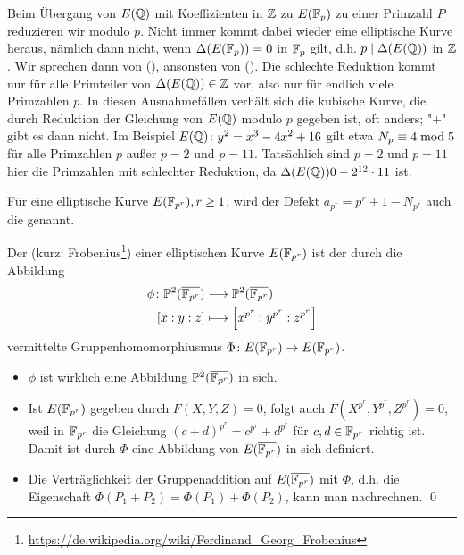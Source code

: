 \begin{bem}
	Beim Übergang von $E(\mathbb{Q})$ mit Koeffizienten in $\mathbb{Z}$ zu $E(\mathbb{F}_p)$ zu einer Primzahl $P$ reduzieren wir modulo $p$.
	Nicht immer kommt dabei wieder eine elliptische Kurve heraus, nämlich dann nicht, wenn $\Delta(E(\mathbb{F}_p)) = 0$ in $\mathbb{F}_p$ gilt, d.h. $p \mid \Delta(E(\mathbb{Q}))$ in $\mathbb{Z}$.
	Wir sprechen dann von  (), ansonsten von  ().  
	Die schlechte Reduktion kommt nur für alle Primteiler von $\Delta(E(\mathbb{Q})) \in \mathbb{Z}$ vor, also nur für endlich viele Primzahlen $p$.
	In diesen Ausnahmefällen verhält sich die kubische Kurve, die durch Reduktion der Gleichung von $E(\mathbb{Q})$ modulo $p$ gegeben ist, oft anders; "$+$" gibt es dann nicht.
	Im Beispiel $E(\mathbb{Q}) \colon y^2 = x^3-4x^2+16$ gilt etwa $N_p \equiv 4 \bmod 5$ für alle Primzahlen $p$ außer $p = 2$ und $p=11$.
	Tatsächlich sind $p=2$ und $p=11$ hier die Primzahlen mit schlechter Reduktion, da $\Delta(E(\mathbb{Q})) 0 -2^{12} \cdot 11$ ist.
\end{bem}

\begin{defn}
	Für eine elliptische Kurve $E(\mathbb{F}_{p^r}), r \geq 1$, wird der Defekt $a_{p^r} = p^r + 1 - N_{p^r}$ auch die  genannt.
\end{defn}

\begin{defn}[Frobeniusendomorphismus]
	Der  (kurz: Frobenius\footnote{\url{https://de.wikipedia.org/wiki/Ferdinand_Georg_Frobenius}}) einer elliptischen Kurve $E(\mathbb{F}_{p^r})$ ist der durch die Abbildung
	\begin{equation}
	\begin{aligned}
		\phi \colon \mathbb{P}^2(\overline{\mathbb{F}_{p^r}}) &\longrightarrow \mathbb{P}^2(\overline{\mathbb{F}_{p^r}}) \\
		[x:y:z] &\longmapsto \left\lbrack x^{p^r} : y^{p^r} : z^{p^r}\right\rbrack
	\end{aligned}
	\end{equation}
	vermittelte Gruppenhomomorphiusmus $\Phi\colon E(\overline{\mathbb{F}_{p^r}}) \rightarrow E(\overline{\mathbb{F}_{p^r}})$.
\end{defn}

	\begin{itemize}
		\item $\phi$ ist wirklich eine Abbildung $\mathbb{P}^2(\overline{\mathbb{F}_{p^r}})$ in sich.
		\item Ist $E(\mathbb{F}_{p^r})$ gegeben durch $F(X,Y,Z) = 0$, folgt auch $F(X^{p^r},Y^{p^r},Z^{p^r}) = 0$, weil in $\overline{\mathbb{F}_{p^r}}$ die Gleichung $(c+d)^{p^r} = c^{p^r} + d^{p^r}$ für $c,d \in \overline{\mathbb{F}_{p^r}}$ richtig ist.
		Damit ist durch $\Phi$ eine Abbildung von $E(\overline{\mathbb{F}_{p^r}})$ in sich definiert.
		\item Die Verträglichkeit der Gruppenaddition auf $E(\overline{\mathbb{F}_{p^r}})$ mit $\Phi$, d.h. die Eigenschaft $\Phi(P_1+P_2) = \Phi(P_1) + \Phi(P_2)$, kann man nachrechnen. \qed
	\end{itemize}
	

